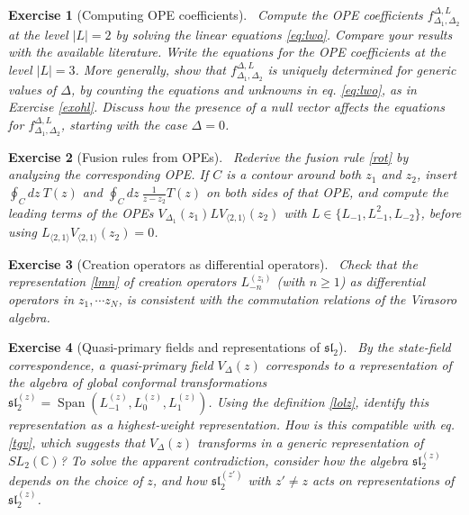 \documentclass[12pt, a4paper, notitlepage, twoside]{report}
\numberwithin{equation}{section}
\theoremstyle{break}
\newtheorem{exo}{Exercise}[chapter]
\begin{document}
\begin{exo}[Computing OPE coefficients]
 ~\label{exohf}
Compute the OPE coefficients $f^{\Delta,L}_{\Delta_1,\Delta_2}$ at the level $|L|= 2$ by solving the linear equations \eqref{eq:lwo}.
Compare your results with the available literature.
Write the equations for the OPE coefficients at the level $|L|=3$. 
More generally, show that $f^{\Delta,L}_{\Delta_1,\Delta_2}$ is uniquely determined for generic values of $\Delta$, 
by counting the equations and unknowns in eq. \eqref{eq:lwo}, as in Exercise \ref{exohl}.
Discuss how the presence of a null vector affects the equations for $f^{\Delta,L}_{\Delta_1,\Delta_2}$, starting with the case $\Delta=0$. 
\end{exo}

\begin{exo}[Fusion rules from OPEs]
 ~\label{exooit}
Rederive the fusion rule \eqref{rot} by analyzing the corresponding OPE.
If $C$ is a contour around both $z_1$ and $z_2$, insert $\oint_C dz\ T(z)$ and $\oint_C dz\ \frac{1}{z-z_2}T(z)$ on both sides of that OPE, and compute the leading terms of the OPEs $V_{\Delta_1}(z_1) LV_{\langle 2,1 \rangle}(z_2)$ with $L\in\{L_{-1},L_{-1}^2,L_{-2}\}$, before using $L_{\langle 2,1 \rangle} V_{\langle 2,1 \rangle} (z_2) =0$. 
\end{exo}

\begin{exo}[Creation operators as differential operators]
 ~\label{exodma}
 Check that the representation \eqref{lmn} of creation operators $L_{-n}^{(z_i)}$ (with $n\geq 1$) as differential operators in $z_1,\cdots z_N$, is consistent with the commutation relations of the Virasoro algebra. 
\end{exo}

\begin{exo}[Quasi-primary fields and representations of $\mathfrak{sl}_2$]
 ~\label{exoqp}
By the state-field correspondence, a quasi-primary field $V_\Delta(z)$ corresponds to a representation of the algebra of global conformal transformations $\mathfrak{sl}_2^{(z)} = \operatorname{Span}(L_{-1}^{(z)},L_0^{(z)},L_1^{(z)})$.
Using the definition \eqref{lolz}, identify this representation as a highest-weight representation.
How is this compatible with eq. \eqref{tgv}, which suggests that $V_\Delta(z)$ transforms in a generic representation of $SL_2({\mathbb{C}})$? To solve the apparent contradiction, consider how the algebra $\mathfrak{sl}_2^{(z)}$ depends on the choice of $z$, and how $\mathfrak{sl}_2^{(z')}$ with $z'\neq z$ acts on representations of $\mathfrak{sl}_2^{(z)}$.
\end{exo}
\end{document}
